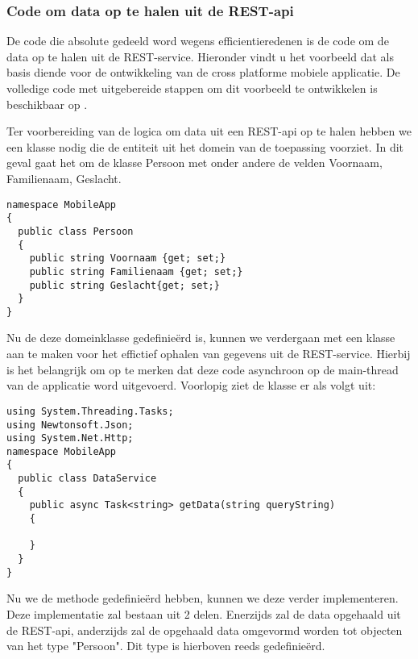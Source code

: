 \subsubsection{Code om data op te halen uit de REST-api}


De code die absolute gedeeld word wegens efficientieredenen is de code om de data op te halen uit de REST-service.
Hieronder vindt u het voorbeeld dat als basis diende voor de ontwikkeling van de cross platforme mobiele applicatie.
De volledige code met uitgebereide stappen om dit voorbeeld te ontwikkelen is beschikbaar op \citep{buildappwithnativeuiusingxamarininvisualstudio}.

Ter voorbereiding van de logica om data uit een REST-api op te halen hebben we een klasse nodig die de entiteit uit het
domein van de toepassing voorziet. In dit geval gaat het om de klasse Persoon met onder andere de velden Voornaam, Familienaam, Geslacht.
\begin{lstlisting}
namespace MobileApp
{
  public class Persoon
  {
    public string Voornaam {get; set;}
    public string Familienaam {get; set;}
    public string Geslacht{get; set;}
  }
}
\end{lstlisting}
\newpage
Nu de deze domeinklasse gedefinieërd is, kunnen we verdergaan met een klasse aan te maken voor het effictief ophalen van
gegevens uit de REST-service. Hierbij is het belangrijk om op te merken dat deze code asynchroon op de main-thread van de
applicatie word uitgevoerd. Voorlopig ziet de klasse er als volgt uit:
\begin{lstlisting}
using System.Threading.Tasks;
using Newtonsoft.Json;
using System.Net.Http;
namespace MobileApp
{
  public class DataService
  {
    public async Task<string> getData(string queryString)
    {

    }
  }
}
\end{lstlisting}
Nu we de methode gedefinieërd hebben, kunnen we deze verder implementeren.
Deze implementatie zal bestaan uit 2 delen. Enerzijds zal de data opgehaald uit de REST-api, anderzijds zal de opgehaald data
omgevormd worden tot objecten van het type "Persoon". Dit type is hierboven reeds gedefinieërd.

